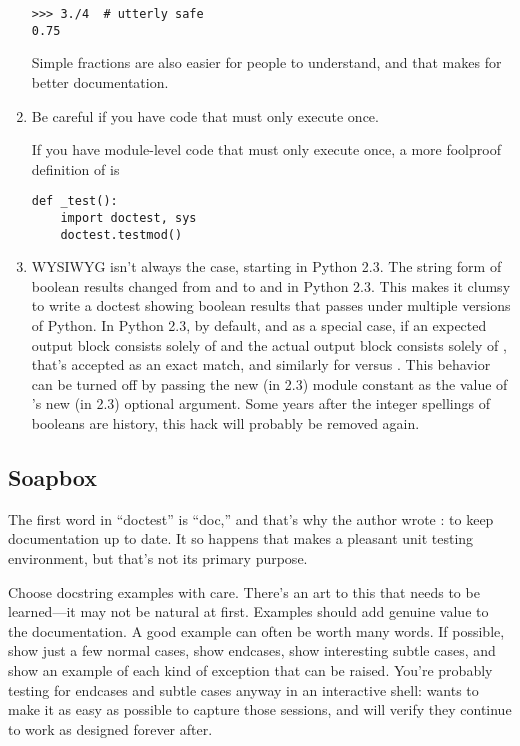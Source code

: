 \begin{enumerate}
\begin{verbatim}
>>> 3./4  # utterly safe
0.75
\end{verbatim}

Simple fractions are also easier for people to understand, and that makes
for better documentation.

\item Be careful if you have code that must only execute once.

If you have module-level code that must only execute once, a more foolproof
definition of  is

\begin{verbatim}
def _test():
    import doctest, sys
    doctest.testmod()
\end{verbatim}

\item WYSIWYG isn't always the case, starting in Python 2.3.  The
  string form of boolean results changed from  and
   to  and  in Python 2.3.
  This makes it clumsy to write a doctest showing boolean results that
  passes under multiple versions of Python.  In Python 2.3, by default,
  and as a special case, if an expected output block consists solely
  of  and the actual output block consists solely of
  , that's accepted as an exact match, and similarly for
   versus .  This behavior can be turned off by
  passing the new (in 2.3) module constant
   as the value of 's
  new (in 2.3) optional  argument.  Some years after
  the integer spellings of booleans are history, this hack will
  probably be removed again.

\end{enumerate}


\subsection{Soapbox}

The first word in ``doctest'' is ``doc,'' and that's why the author
wrote : to keep documentation up to date.  It so
happens that  makes a pleasant unit testing
environment, but that's not its primary purpose.

Choose docstring examples with care.  There's an art to this that
needs to be learned---it may not be natural at first.  Examples should
add genuine value to the documentation.  A good example can often be
worth many words.  If possible, show just a few normal cases, show
endcases, show interesting subtle cases, and show an example of each
kind of exception that can be raised.  You're probably testing for
endcases and subtle cases anyway in an interactive shell:
 wants to make it as easy as possible to capture
those sessions, and will verify they continue to work as designed
forever after.

